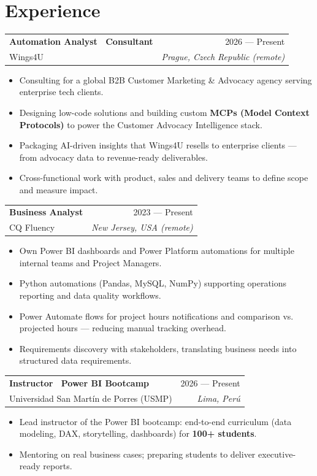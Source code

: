 \documentclass[10pt,letterpaper]{article}
\makeatletter
\newcommand{\jobheader}[4]{%
  \noindent\begin{tabularx}{\linewidth}{@{}X r@{}}
    \textbf{\color{ink}#1} & \textcolor{inkmute}{\small #3} \\
    \textcolor{inkdim}{#2} & \textcolor{inkmute}{\small\itshape #4}
  \end{tabularx}\par\vspace{2pt}
}
\makeatother
\begin{document}
\section*{Experience}

\jobheader{Automation Analyst \textperiodcentered\ Consultant}{Wings4U}{2026 --- Present}{Prague, Czech Republic (remote)}
\begin{itemize}
  \item Consulting for a global B2B Customer Marketing \& Advocacy agency serving enterprise tech clients.
  \item Designing low-code solutions and building custom \textbf{MCPs (Model Context Protocols)} to power the Customer Advocacy Intelligence stack.
  \item Packaging AI-driven insights that Wings4U resells to enterprise clients --- from advocacy data to revenue-ready deliverables.
  \item Cross-functional work with product, sales and delivery teams to define scope and measure impact.
\end{itemize}

\jobheader{Business Analyst}{CQ Fluency}{2023 --- Present}{New Jersey, USA (remote)}
\begin{itemize}
  \item Own Power BI dashboards and Power Platform automations for multiple internal teams and Project Managers.
  \item Python automations (Pandas, MySQL, NumPy) supporting operations reporting and data quality workflows.
  \item Power Automate flows for project hours notifications and comparison vs. projected hours --- reducing manual tracking overhead.
  \item Requirements discovery with stakeholders, translating business needs into structured data requirements.
\end{itemize}

\jobheader{Instructor \textperiodcentered\ Power BI Bootcamp}{Universidad San Martín de Porres (USMP)}{2026 --- Present}{Lima, Perú}
\begin{itemize}
  \item Lead instructor of the Power BI bootcamp: end-to-end curriculum (data modeling, DAX, storytelling, dashboards) for \textbf{100+ students}.
  \item Mentoring on real business cases; preparing students to deliver executive-ready reports.
\end{itemize}
\end{document}
